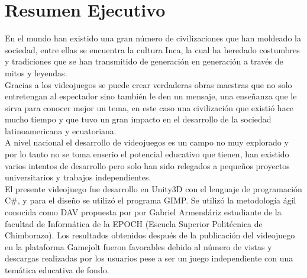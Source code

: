 \documentclass[a4paper, openright, 12pt]{report}
\begin{document}
\chapter*{Resumen Ejecutivo}
{}
\justify
En el mundo han existido una gran número de civilizaciones que han moldeado la sociedad, entre ellas se encuentra la cultura Inca, la cual ha heredado costumbres y tradiciones que se han transmitido de generación en generación a través de mitos y leyendas.\\
\justify
Gracias a los videojuegos se puede crear verdaderas obras maestras que no solo entretengan al espectador sino también le den un mensaje, una enseñanza que le sirva para conocer mejor un tema, en este caso una civilización que existió hace mucho tiempo y que tuvo un gran impacto en el desarrollo de la sociedad latinoamericana y ecuatoriana.\\
\justify
A nivel nacional el desarrollo de videojuegos es un campo no muy explorado y por lo tanto no se toma enserio el potencial educativo que tienen, han existido varios intentos de desarrollo pero solo han sido relegados a pequeños proyectos universitarios y trabajos independientes.\\
\justify
El presente videojuego fue desarrollo en Unity3D con el lenguaje de programación C\#, y para el diseño se utilizó el programa GIMP.
\justify
Se utilizó la metodología ágil conocida como DAV propuesta por por Gabriel Armendáriz estudiante de la facultad de Informática de la EPOCH (Escuela Superior Politécnica de Chimborazo).
\justify
Los resultados obtenidos después de la publicación del videojuego en la plataforma Gamejolt fueron favorables debido al número de vistas y descargas realizadas por los usuarios pese a ser un juego independiente con una temática educativa de fondo.

\newpage
\end{document}
